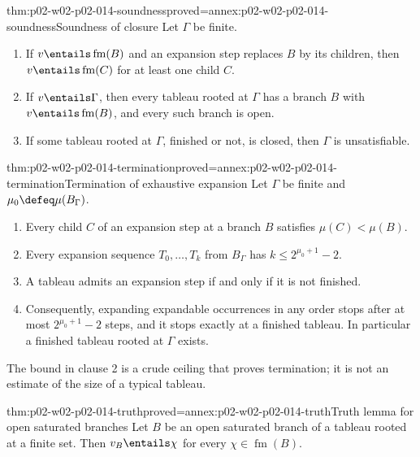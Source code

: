 \begin{hbtheorem}{thm:p02-w02-p02-014-soundness}{proved=annex:p02-w02-p02-014-soundness}{Soundness of closure}
Let \(\Gamma\) be finite.
\begin{enumerate}
  \item If \(v\entails\operatorname{fm}(B)\) and an expansion step replaces \(B\) by its
        children, then \(v\entails\operatorname{fm}(C)\) for at least one child \(C\).
  \item If \(v\entails\Gamma\), then every tableau rooted at \(\Gamma\) has a
        branch \(B\) with \(v\entails\operatorname{fm}(B)\), and every such branch is open.
  \item If some tableau rooted at \(\Gamma\), finished or not, is closed, then
        \(\Gamma\) is unsatisfiable.
\end{enumerate}
\end{hbtheorem}

\begin{hbtheorem}{thm:p02-w02-p02-014-termination}{proved=annex:p02-w02-p02-014-termination}{Termination of exhaustive expansion}
Let \(\Gamma\) be finite and \(\mu_0\defeq\mu(B_\Gamma)\).
\begin{enumerate}
  \item Every child \(C\) of an expansion step at a branch \(B\) satisfies
        \(\mu(C)<\mu(B)\).
  \item Every expansion sequence \(T_0,\ldots,T_k\) from \(B_\Gamma\) has
        \(k\leq 2^{\mu_0+1}-2\).
  \item A tableau admits an expansion step if and only if it is not finished.
  \item Consequently, expanding expandable occurrences in any order stops
        after at most \(2^{\mu_0+1}-2\) steps, and it stops exactly at a
        finished tableau.  In particular a finished tableau rooted at
        \(\Gamma\) exists.
\end{enumerate}
\end{hbtheorem}

The bound in clause 2 is a crude ceiling that proves termination; it is not
an estimate of the size of a typical tableau.

\begin{hblemma}{thm:p02-w02-p02-014-truth}{proved=annex:p02-w02-p02-014-truth}{Truth lemma for open saturated branches}
Let \(B\) be an open saturated branch of a tableau rooted at a finite set.
Then \(v_B\entails\chi\) for every \(\chi\in\operatorname{fm}(B)\).
\end{hblemma}

